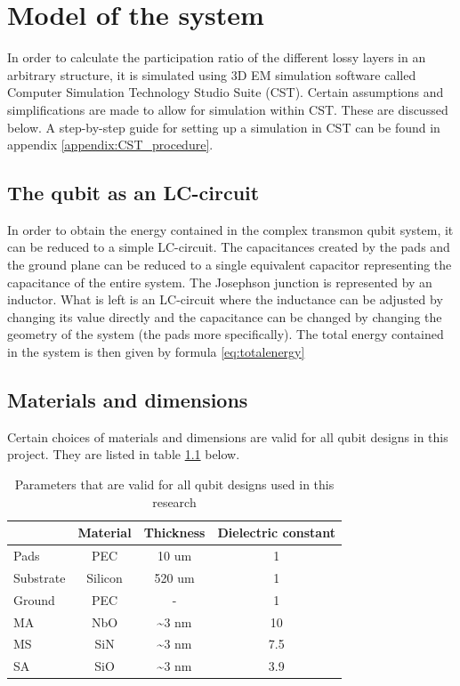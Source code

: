 \chapter{Model of the system}
In order to calculate the participation ratio of the different lossy layers in an arbitrary structure, it is simulated using 3D EM simulation software called Computer Simulation Technology Studio Suite (CST). Certain assumptions and simplifications are made to allow for simulation within CST. These are discussed below. A step-by-step guide for setting up a simulation in CST can be found in appendix \ref{appendix:CST_procedure}.

\section{The qubit as an LC-circuit}
In order to obtain the energy contained in the complex transmon qubit system, it can be reduced to a simple LC-circuit. The capacitances created by the pads and the ground plane can be reduced to a single equivalent capacitor representing the capacitance of the entire system. The Josephson junction is represented by an inductor. What is left is an LC-circuit where the inductance can be adjusted by changing its value directly and the capacitance can be changed by changing the geometry of the system (the pads more specifically). The total energy contained in the system is then given by formula \eqref{eq:totalenergy}

\section{Materials and dimensions}
Certain choices of materials and dimensions are valid for all qubit designs in this project. They are listed in table \ref{table:standard_parameters} below.

\begin{table}
	\begin{center}
		\begin{tabular}{ | l || c | c | c |}
			\hline
			 & Material & Thickness & Dielectric constant \\ \hline
			Pads & PEC & 10 um & 1 \\
			Substrate & Silicon & 520 um & 1 \\
			Ground & PEC & - & 1 \\
			MA & NbO & \textasciitilde 3 nm & 10 \\
			MS & SiN & \textasciitilde 3 nm & 7.5 \\
			SA & SiO & \textasciitilde 3 nm & 3.9 \\
			\hline
		\end{tabular}
	\end{center}
	\caption{Parameters that are valid for all qubit designs used in this research}
	\label{table:standard_parameters}
\end{table}


